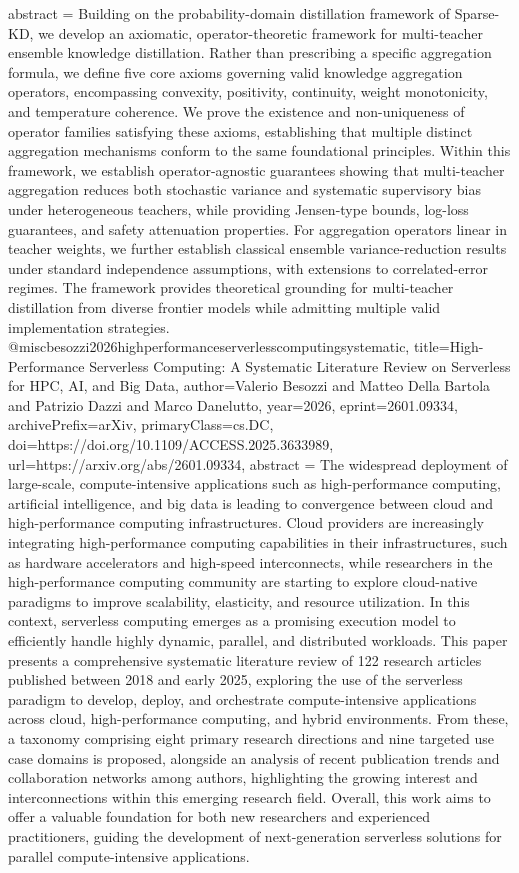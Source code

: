 {      abstract = {Building on the probability-domain distillation framework of Sparse-KD, we develop an axiomatic, operator-theoretic framework for multi-teacher ensemble knowledge distillation. Rather than prescribing a specific aggregation formula, we define five core axioms governing valid knowledge aggregation operators, encompassing convexity, positivity, continuity, weight monotonicity, and temperature coherence. We prove the existence and non-uniqueness of operator families satisfying these axioms, establishing that multiple distinct aggregation mechanisms conform to the same foundational principles.   Within this framework, we establish operator-agnostic guarantees showing that multi-teacher aggregation reduces both stochastic variance and systematic supervisory bias under heterogeneous teachers, while providing Jensen-type bounds, log-loss guarantees, and safety attenuation properties. For aggregation operators linear in teacher weights, we further establish classical ensemble variance-reduction results under standard independence assumptions, with extensions to correlated-error regimes. The framework provides theoretical grounding for multi-teacher distillation from diverse frontier models while admitting multiple valid implementation strategies.}
}@misc{besozzi2026highperformanceserverlesscomputingsystematic,
      title={High-Performance Serverless Computing: A Systematic Literature Review on Serverless for HPC, AI, and Big Data}, 
      author={Valerio Besozzi and Matteo Della Bartola and Patrizio Dazzi and Marco Danelutto},
      year={2026},
      eprint={2601.09334},
      archivePrefix={arXiv},
      primaryClass={cs.DC},
      doi={https://doi.org/10.1109/ACCESS.2025.3633989},
      url={https://arxiv.org/abs/2601.09334},
      abstract = {The widespread deployment of large-scale, compute-intensive applications such as high-performance computing, artificial intelligence, and big data is leading to convergence between cloud and high-performance computing infrastructures. Cloud providers are increasingly integrating high-performance computing capabilities in their infrastructures, such as hardware accelerators and high-speed interconnects, while researchers in the high-performance computing community are starting to explore cloud-native paradigms to improve scalability, elasticity, and resource utilization. In this context, serverless computing emerges as a promising execution model to efficiently handle highly dynamic, parallel, and distributed workloads. This paper presents a comprehensive systematic literature review of 122 research articles published between 2018 and early 2025, exploring the use of the serverless paradigm to develop, deploy, and orchestrate compute-intensive applications across cloud, high-performance computing, and hybrid environments. From these, a taxonomy comprising eight primary research directions and nine targeted use case domains is proposed, alongside an analysis of recent publication trends and collaboration networks among authors, highlighting the growing interest and interconnections within this emerging research field. Overall, this work aims to offer a valuable foundation for both new researchers and experienced practitioners, guiding the development of next-generation serverless solutions for parallel compute-intensive applications.}
}
